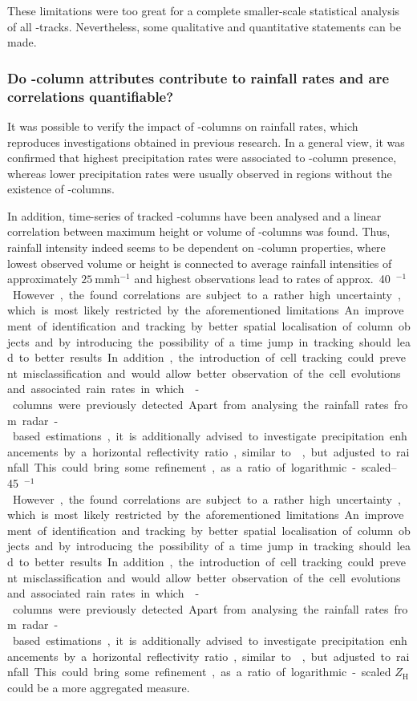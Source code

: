 These limitations were too great for a complete smaller-scale statistical analysis of all \zdr-tracks. 
Nevertheless, some qualitative and quantitative statements can be made.

\subsubsection{Do \zdr-column attributes contribute to rainfall rates and are correlations quantifiable?}
It was possible to verify the impact of \zdr-columns on rainfall rates, which reproduces investigations obtained in previous research. In a general view, it was confirmed that highest precipitation rates were associated to \zdr-column presence, whereas lower precipitation rates were usually observed in regions without the existence of \zdr-columns. 

In addition, time-series of tracked \zdr-columns have been analysed and a linear correlation between maximum height or volume of \zdr-columns was found. 
Thus, rainfall intensity indeed seems to be dependent on \zdr-column properties, where lowest observed volume or height is connected to average rainfall intensities of approximately $\SI{25}{\milli\metre\hour^{-1}}$ and highest observations lead to rates of approx.\ \SIrange{40}{45}{\milli\metre\hour$^{-1}$}.
However, the found correlations are subject to a rather high uncertainty, which is most likely restricted by the aforementioned limitations. An improvement of identification and tracking by better spatial localisation of column objects and by introducing the possibility of a time jump in tracking should lead to better results. In addition, the introduction of cell tracking could prevent misclassification and would allow better observation of the cell evolutions and associated rain rates in which \zdr-columns were previously detected.

Apart from analysing the rainfall rates from radar-based estimations, it is additionally advised to investigate precipitation enhancements by a horizontal reflectivity ratio, similar to \textcite{picca2010zdr}, but adjusted to rainfall. This could bring some refinement, as a ratio of logarithmic-scaled $Z_\text{H}$ could be a more  aggregated measure. 

